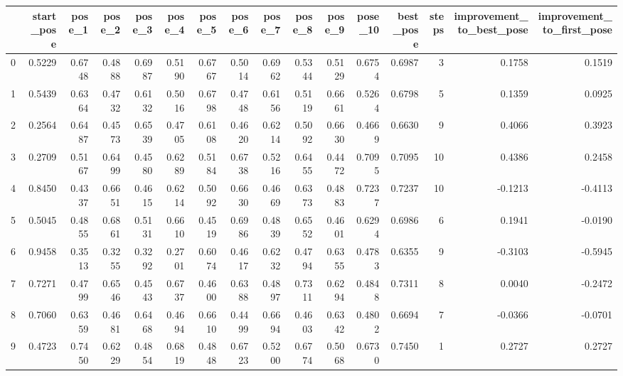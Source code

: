 \begin{tabular}{lrrrrrrrrrrrrrrr}
\toprule
{} &  start\_pose &  pose\_1 &  pose\_2 &  pose\_3 &  pose\_4 &  pose\_5 &  pose\_6 &  pose\_7 &  pose\_8 &  pose\_9 &  pose\_10 &  best\_pose &  steps &  improvement\_to\_best\_pose &  improvement\_to\_first\_pose \\
\midrule
0   &      0.5229 &  0.6748 &  0.4888 &  0.6987 &  0.5190 &  0.6767 &  0.5014 &  0.6962 &  0.5344 &  0.5129 &   0.6754 &     0.6987 &      3 &                    0.1758 &                     0.1519 \\
1   &      0.5439 &  0.6364 &  0.4732 &  0.6132 &  0.5016 &  0.6798 &  0.4748 &  0.6156 &  0.5119 &  0.6661 &   0.5264 &     0.6798 &      5 &                    0.1359 &                     0.0925 \\
2   &      0.2564 &  0.6487 &  0.4573 &  0.6539 &  0.4705 &  0.6108 &  0.4620 &  0.6214 &  0.5092 &  0.6630 &   0.4669 &     0.6630 &      9 &                    0.4066 &                     0.3923 \\
3   &      0.2709 &  0.5167 &  0.6499 &  0.4580 &  0.6289 &  0.5184 &  0.6738 &  0.5216 &  0.6455 &  0.4472 &   0.7095 &     0.7095 &     10 &                    0.4386 &                     0.2458 \\
4   &      0.8450 &  0.4337 &  0.6651 &  0.4615 &  0.6214 &  0.5092 &  0.6630 &  0.4669 &  0.6373 &  0.4883 &   0.7237 &     0.7237 &     10 &                   -0.1213 &                    -0.4113 \\
5   &      0.5045 &  0.4855 &  0.6861 &  0.5131 &  0.6610 &  0.4519 &  0.6986 &  0.4839 &  0.6552 &  0.4601 &   0.6294 &     0.6986 &      6 &                    0.1941 &                    -0.0190 \\
6   &      0.9458 &  0.3513 &  0.3255 &  0.3292 &  0.2701 &  0.6074 &  0.4617 &  0.6232 &  0.4794 &  0.6355 &   0.4783 &     0.6355 &      9 &                   -0.3103 &                    -0.5945 \\
7   &      0.7271 &  0.4799 &  0.6546 &  0.4543 &  0.6737 &  0.4600 &  0.6388 &  0.4897 &  0.7311 &  0.6294 &   0.4848 &     0.7311 &      8 &                    0.0040 &                    -0.2472 \\
8   &      0.7060 &  0.6359 &  0.4681 &  0.6468 &  0.4694 &  0.6610 &  0.4499 &  0.6694 &  0.4603 &  0.6342 &   0.4802 &     0.6694 &      7 &                   -0.0366 &                    -0.0701 \\
9   &      0.4723 &  0.7450 &  0.6229 &  0.4854 &  0.6819 &  0.4848 &  0.6723 &  0.5200 &  0.6774 &  0.5068 &   0.6730 &     0.7450 &      1 &                    0.2727 &                     0.2727 \\

\end{tabular}
